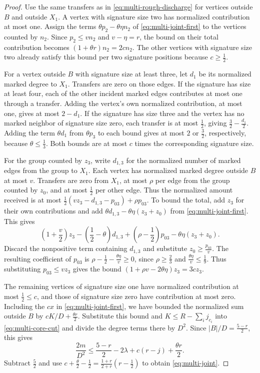 \documentclass[preprint,11pt,numbers]{elsarticle-arxiv}
\numberwithin{equation}{section}
\theoremstyle{definition}
\begin{document}
\begin{proof}
Use the same transfers as in \eqref{eq:multi-rough-discharge}
for vertices outside $B$ and outside $X_1$. A vertex with signature
size two has normalized contribution at most one. Assign the
terms $\theta p_2-\theta\eta n_2$ of
\eqref{eq:multi-joint-first} to the vertices counted by $n_2$.
Since $p_2\leq v n_2$ and $v-\eta=r$, the bound on their total
contribution becomes $(1+\theta r)n_2=2c n_2$.
The other vertices with signature size two already satisfy this
bound per two signature positions because $c\geq\frac12$.

For a vertex outside $B$ with signature size at least three, let
$d_1$ be its normalized marked degree to $X_1$. Transfers are zero
on those edges. If the signature has size at least four, each of
the other incident marked edges contributes at most one through
a transfer. Adding the vertex's own normalized contribution,
at most one, gives at most $2-d_1$. If the signature has size three
and the vertex has no marked neighbor of signature size zero,
each transfer is at most $\frac12$, giving
$\frac32-\frac{d_1}{2}$. Adding the term $\theta d_1$ from
$\theta p_3$ to each bound gives at most $2$ or $\frac32$,
respectively, because $\theta\leq\frac13$. Both bounds are at most
$c$ times the corresponding signature size.

For the group counted by $z_3$, write $d_{1,3}$ for the normalized
number of marked edges from the group to $X_1$. Each vertex
has normalized marked degree outside $B$ at most $v$. Transfers
are zero from $X_1$, at most $\rho$ per edge from the group counted
by $z_0$, and at most $\frac12$ per other edge. Thus the normalized
amount received is at most
$\frac12(vz_3-d_{1,3}-p_{03})+\rho p_{03}$. To bound the total,
add $z_3$ for their own contributions and add
$\theta d_{1,3}-\theta\eta(z_3+z_0)$ from
\eqref{eq:multi-joint-first}. This gives
\[
 \left(1+\frac{v}{2}\right)z_3
 -\left(\frac{1}{2}-\theta\right)d_{1,3}
 +\left(\rho-\frac{1}{2}\right)p_{03}-\theta\eta(z_3+z_0).
\]
Discard the nonpositive term containing $d_{1,3}$ and substitute
$z_0\geq\frac{p_{03}}{v}$. The resulting coefficient of $p_{03}$
is $\rho-\frac12-\frac{\theta\eta}{v}\geq0$, since
$\rho\geq\frac23$ and $\frac{\theta\eta}{v}\leq\frac19$.
Thus substituting $p_{03}\leq v z_3$ gives the bound
$(1+\rho v-2\theta\eta)z_3=3c z_3$.

The remaining vertices of signature size one have normalized
contribution at most $\frac12\leq c$, and those of signature size
zero have contribution at most zero. Including the $cx$ in
\eqref{eq:multi-joint-first}, we have bounded the normalized
sum outside $B$ by $cK/D+\frac{\theta r}{2}$. Substitute this
bound and $K\leq R-\sum_i j_{c_i}$ into \eqref{eq:multi-core-cut}
and divide the degree terms there by $D^2$. Since
$|B|/D=\frac{5-r}{2}$, this gives
\[
 \frac{2m}{D^2}\leq\frac{5-r}{2}-2\lambda+c(r-j)
                   +\frac{\theta r}{2}.
\]
Subtract $\frac52$ and use
$c+\frac{\theta}{2}-\frac12=\frac{1+r}{2+r}(r-\frac12)$
to obtain \eqref{eq:multi-joint}.

\end{proof}
\relax\space%
\end{document}
